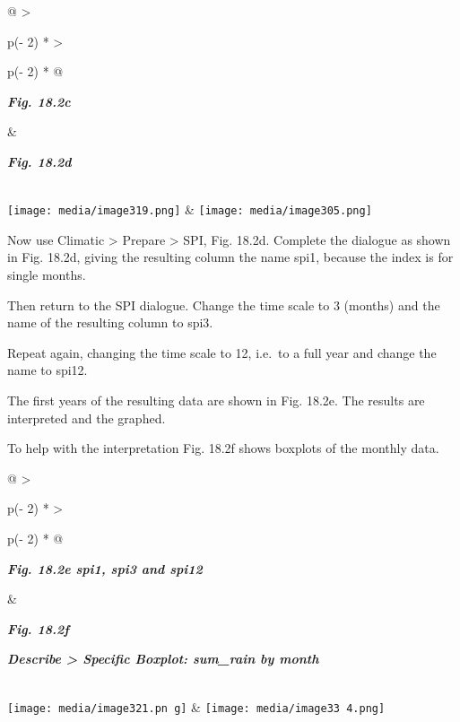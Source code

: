 \documentclass[
  letterpaper,
  DIV=11,
  numbers=noendperiod]{scrreprt}
\begin{document}
\begin{longtable}[]{@{}
  >{\raggedright\arraybackslash}p{(\columnwidth - 2\tabcolsep) * }
  >{\raggedright\arraybackslash}p{(\columnwidth - 2\tabcolsep) * }@{}}
\toprule\noalign{}
\begin{minipage}[b]{\linewidth}\raggedright
\textbf{\emph{Fig. 18.2c}}
\end{minipage} & \begin{minipage}[b]{\linewidth}\raggedright
\textbf{\emph{Fig. 18.2d}}
\end{minipage} \\
\midrule\noalign{}
\endhead
\bottomrule\noalign{}
\endlastfoot
\texttt{[image: media/image319.png]} &
\texttt{[image: media/image305.png]} \\
\end{longtable}

Now use Climatic \textgreater{} Prepare \textgreater{} SPI, Fig. 18.2d.
Complete the dialogue as shown in Fig. 18.2d, giving the resulting
column the name spi1, because the index is for single months.

Then return to the SPI dialogue. Change the time scale to 3 (months) and
the name of the resulting column to spi3.

Repeat again, changing the time scale to 12, i.e.~to a full year and
change the name to spi12.

The first years of the resulting data are shown in Fig. 18.2e. The
results are interpreted and the graphed.

To help with the interpretation Fig. 18.2f shows boxplots of the monthly
data.

\begin{longtable}[]{@{}
  >{\raggedright\arraybackslash}p{(\columnwidth - 2\tabcolsep) * }
  >{\raggedright\arraybackslash}p{(\columnwidth - 2\tabcolsep) * }@{}}
\toprule\noalign{}
\begin{minipage}[b]{\linewidth}\raggedright
\textbf{\emph{Fig. 18.2e spi1, spi3 and spi12}}
\end{minipage} & \begin{minipage}[b]{\linewidth}\raggedright
\textbf{\emph{Fig. 18.2f}}

\textbf{\emph{Describe \textgreater{} Specific Boxplot: sum\_rain by
month}}
\end{minipage} \\
\midrule\noalign{}
\endhead
\bottomrule\noalign{}
\endlastfoot
\texttt{[image: media/image321.pn g]}
&
\texttt{[image: media/image33 4.png]} \\
\end{longtable}
\end{document}
